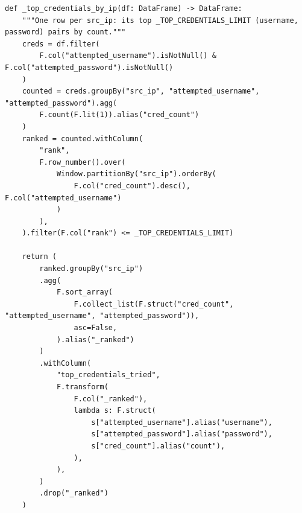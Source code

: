 \documentclass[11pt,a4paper]{report}
\begin{document}
\begin{lstlisting}[style=pystyle]
def _top_credentials_by_ip(df: DataFrame) -> DataFrame:
    """One row per src_ip: its top _TOP_CREDENTIALS_LIMIT (username, password) pairs by count."""
    creds = df.filter(
        F.col("attempted_username").isNotNull() & F.col("attempted_password").isNotNull()
    )
    counted = creds.groupBy("src_ip", "attempted_username", "attempted_password").agg(
        F.count(F.lit(1)).alias("cred_count")
    )
    ranked = counted.withColumn(
        "rank",
        F.row_number().over(
            Window.partitionBy("src_ip").orderBy(
                F.col("cred_count").desc(), F.col("attempted_username")
            )
        ),
    ).filter(F.col("rank") <= _TOP_CREDENTIALS_LIMIT)

    return (
        ranked.groupBy("src_ip")
        .agg(
            F.sort_array(
                F.collect_list(F.struct("cred_count", "attempted_username", "attempted_password")),
                asc=False,
            ).alias("_ranked")
        )
        .withColumn(
            "top_credentials_tried",
            F.transform(
                F.col("_ranked"),
                lambda s: F.struct(
                    s["attempted_username"].alias("username"),
                    s["attempted_password"].alias("password"),
                    s["cred_count"].alias("count"),
                ),
            ),
        )
        .drop("_ranked")
    )
\end{lstlisting}
\end{document}
